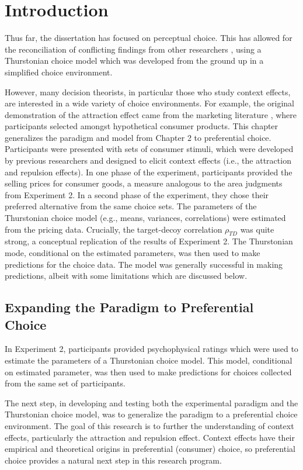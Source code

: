 \section{Introduction}
Thus far, the dissertation has focused on perceptual choice. This has allowed for the reconciliation of conflicting findings from other researchers \parencite{spektorWhenGoodLooks2018b,trueblood2013not}, using a Thurstonian choice model which was developed from the ground up in a simplified choice environment.

However, many decision theorists, in particular those who study context effects, are interested in a wide variety of choice environments. For example, the original demonstration of the attraction effect came from the marketing literature \parencite{huberAddingAsymmetricallyDominated1982d}, where participants selected amongst hypothetical consumer products. This chapter generalizes the paradigm and model from Chapter 2 to preferential choice. Participants were presented with sets of consumer stimuli, which were developed by previous researchers and designed to elicit context effects (i.e., the attraction and repulsion effects). In one phase of the experiment, participants provided the selling prices for consumer goods, a measure analogous to the area judgments from Experiment 2. In a second phase of the experiment, they chose their preferred alternative from the same choice sets. The parameters of the Thurstonian choice model (e.g., means, variances, correlations) were estimated from the pricing data. Crucially, the target-decoy correlation $\rho_{TD}$ was quite strong, a conceptual replication of the results of Experiment 2. The Thurstonian mode, conditional on the estimated parameters, was then used to make predictions for the choice data. The model was generally successful in making predictions, albeit with some limitations which are discussed below. 

\subsection{Expanding the Paradigm to Preferential Choice}

In Experiment 2, participants provided psychophysical ratings which were used to estimate the parameters of a Thurstonian choice model. This model, conditional on estimated parameter, was then used to make predictions for choices collected from the same set of participants. 

The next step, in developing and testing both the experimental paradigm and the Thurstonian choice model, was to generalize the paradigm to a preferential choice environment. The goal of this research is to further the understanding of context effects, particularly the attraction and repulsion effect. Context effects have their empirical and theoretical origins in preferential (consumer) choice, so preferential choice provides a natural next step in this research program.

